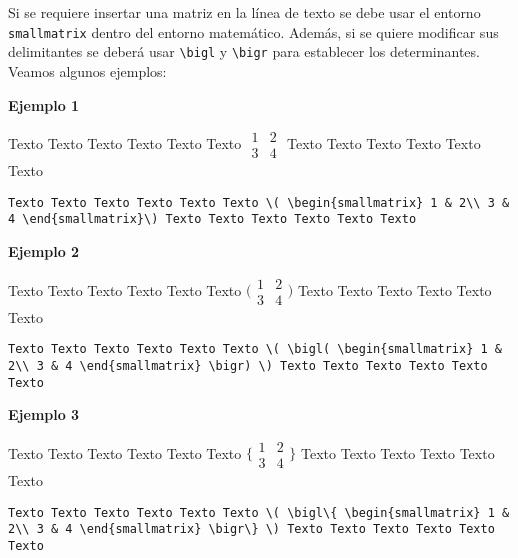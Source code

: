 Si se requiere insertar una matriz en la línea de texto se debe usar el entorno \texttt{smallmatrix} dentro del entorno matemático. Además, si se quiere modificar sus delimitantes se deberá usar \verb|\bigl| y \verb|\bigr| para establecer los determinantes. Veamos algunos ejemplos:

\textbf{Ejemplo 1}

Texto Texto Texto Texto Texto Texto \( \begin{smallmatrix} 1 & 2\\ 3 & 4 \end{smallmatrix}\) Texto Texto Texto Texto Texto Texto

\begin{myquote}
	\begin{lstlisting}
Texto Texto Texto Texto Texto Texto \( \begin{smallmatrix} 1 & 2\\ 3 & 4 \end{smallmatrix}\) Texto Texto Texto Texto Texto Texto
	\end{lstlisting}
\end{myquote}

\textbf{Ejemplo 2}

Texto Texto Texto Texto Texto Texto \( \bigl( \begin{smallmatrix} 1 & 2\\ 3 & 4 \end{smallmatrix} \bigr) \) Texto Texto Texto Texto Texto Texto

\begin{myquote}
	\begin{lstlisting}
Texto Texto Texto Texto Texto Texto \( \bigl( \begin{smallmatrix} 1 & 2\\ 3 & 4 \end{smallmatrix} \bigr) \) Texto Texto Texto Texto Texto Texto
	\end{lstlisting}
\end{myquote}

\textbf{Ejemplo 3}

Texto Texto Texto Texto Texto Texto \( \bigl\{ \begin{smallmatrix} 1 & 2\\ 3 & 4 \end{smallmatrix} \bigr\} \) Texto Texto Texto Texto Texto Texto

\begin{myquote}
	\begin{lstlisting}
Texto Texto Texto Texto Texto Texto \( \bigl\{ \begin{smallmatrix} 1 & 2\\ 3 & 4 \end{smallmatrix} \bigr\} \) Texto Texto Texto Texto Texto Texto
	\end{lstlisting}
\end{myquote}

